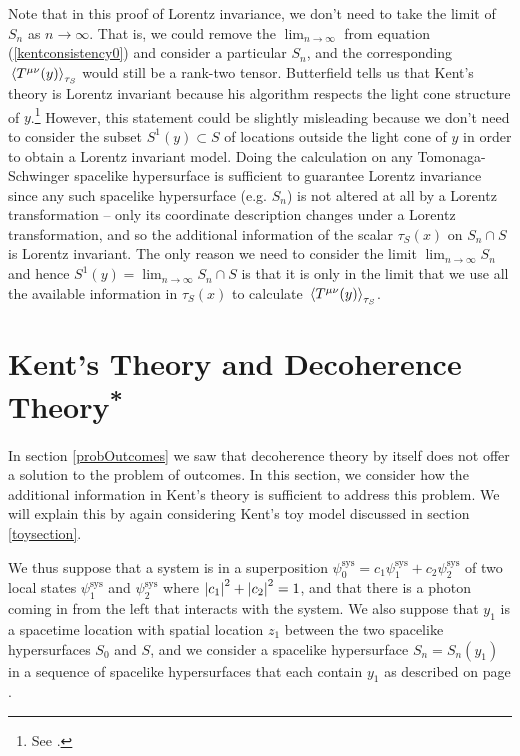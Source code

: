 Note that in this proof of Lorentz invariance, we don't need to take the limit of $S_n$ as $n\rightarrow\infty$. That is, we could remove the $\lim_{n\rightarrow\infty}$ from equation (\ref{kentconsistency0}) and consider a particular $S_n$, and the corresponding $\ev*{T^{\mu\nu}(y)}_{\tau_S}$ would still be a rank-two tensor. Butterfield tells us that Kent's theory is  Lorentz invariant because his algorithm respects the light cone structure of $y$.\footnote{See \cite[30]{Butterfield}.} However, this statement could be slightly misleading because we don't need to consider the subset $S^1(y)\subset S$ of locations outside the light cone of $y$ in order to obtain a Lorentz invariant model. Doing the calculation on any Tomonaga-Schwinger spacelike hypersurface is sufficient to guarantee Lorentz invariance since any such spacelike hypersurface (e.g. $S_n$) is not altered at all by a Lorentz transformation -- only its coordinate description changes under a Lorentz transformation, and so the additional information of the scalar $\tau_S(x)$ on $S_n\cap S$ is Lorentz invariant. The only reason we need to consider the limit $\lim_{n\rightarrow \infty}S_n$ and hence $S^1(y)=\lim_{n\rightarrow \infty}S_n\cap S$ is that it is only in the limit that we use all the available information in $\tau_S(x)$ to calculate $\ev*{T^{\mu\nu}(y)}_{\tau_S}$. 



\section{Kent's Theory\label{Kentdecoherencesection} and Decoherence Theory\textsuperscript{*}}
In section \ref{probOutcomes} we saw that decoherence theory by itself does not offer a solution to the problem of outcomes. In this section, we consider how the additional information in Kent's theory is sufficient to address this problem. We will explain this by again considering  Kent's toy model discussed in section \ref{toysection}.

We thus suppose that a system is in a superposition $\psi_0^\text{sys} = c_1\psi_1^\text{sys}+c_2\psi_2^\text{sys}$ of two local states $\psi_1^\text{sys}$ and $\psi_2^\text{sys}$ where $\abs{c_1}^2+\abs{c_2}^2=1$, and that there is a photon coming in from the left that interacts with the system. We also suppose that  $y_1$ is a spacetime location with spatial location $z_1$ between the two spacelike hypersurfaces $S_0$ and $S$, and we consider a spacelike hypersurface $S_n=S_n(y_1)$  in a sequence of spacelike hypersurfaces that each contain $y_1$ as described on page \pageref{siydef}. 

